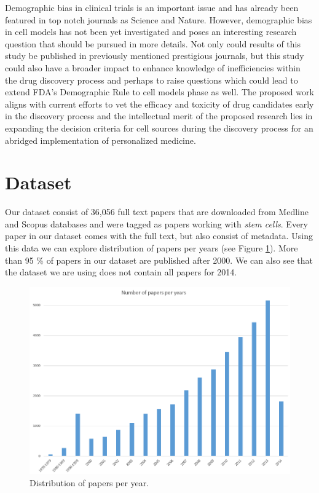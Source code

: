 \documentclass[10pt]{article}
\begin{document}
Demographic bias in clinical trials is an important issue and has already been featured in top notch journals as Science and Nature. However, demographic bias in cell models has not been yet investigated and poses an interesting research question that should be pursued in more details. Not only could results of this study be published in previously mentioned prestigious journals, but this study could also have a broader impact to enhance knowledge of inefficiencies within the drug discovery process and perhaps to raise questions which could lead to extend FDA's Demographic Rule to cell models phase as well. The proposed work aligns with current efforts to vet the efficacy and toxicity of drug candidates early in the discovery process and the intellectual merit of the proposed research lies in expanding the decision criteria for cell sources during the discovery process for an abridged implementation of personalized medicine. 


\section{Dataset}

Our dataset consist of 36,056 full text papers that are downloaded from Medline and Scopus databases and were tagged as papers working with \textit{stem cells}. Every paper in our dataset comes with the full text, but also consist of metadata. Using this data we can explore distribution of papers per years (see Figure \ref{dist1}). More than 95 \% of papers in our dataset are published after 2000. We can also see that the dataset we are using does not contain all papers for 2014. 

\begin{figure}[b!]
\centering
\includegraphics[width=0.98\columnwidth]{Figures/Figure1.png}
\caption{\label{dist1}Distribution of papers per year.}
\end{figure}
\end{document}
